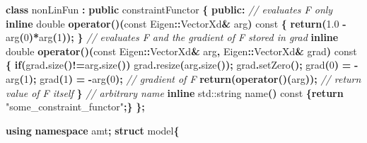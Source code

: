 \documentclass[
]{book}
\newenvironment{Shaded}{\begin{snugshade}}{\end{snugshade}}
\newcommand{\AttributeTok}[1]{\textcolor[rgb]{0.77,0.63,0.00}{#1}}
\newcommand{\BuiltInTok}[1]{#1}
\newcommand{\CommentTok}[1]{\textcolor[rgb]{0.56,0.35,0.01}{\textit{#1}}}
\newcommand{\ControlFlowTok}[1]{\textcolor[rgb]{0.13,0.29,0.53}{\textbf{#1}}}
\newcommand{\DataTypeTok}[1]{\textcolor[rgb]{0.13,0.29,0.53}{#1}}
\newcommand{\DecValTok}[1]{\textcolor[rgb]{0.00,0.00,0.81}{#1}}
\newcommand{\FloatTok}[1]{\textcolor[rgb]{0.00,0.00,0.81}{#1}}
\newcommand{\KeywordTok}[1]{\textcolor[rgb]{0.13,0.29,0.53}{\textbf{#1}}}
\newcommand{\NormalTok}[1]{#1}
\newcommand{\OperatorTok}[1]{\textcolor[rgb]{0.81,0.36,0.00}{\textbf{#1}}}
\newcommand{\StringTok}[1]{\textcolor[rgb]{0.31,0.60,0.02}{#1}}
\begin{document}
\begin{Shaded}
\begin{Highlighting}[]

\KeywordTok{class}\NormalTok{ nonLinFun }\OperatorTok{:} \KeywordTok{public}\NormalTok{ constraintFunctor }\OperatorTok{\{}
\KeywordTok{public}\OperatorTok{:}
  \CommentTok{// evaluates F only}
  \KeywordTok{inline} \DataTypeTok{double} \KeywordTok{operator}\OperatorTok{()(}\AttributeTok{const}\NormalTok{ Eigen}\OperatorTok{::}\NormalTok{VectorXd}\OperatorTok{\&}\NormalTok{ arg}\OperatorTok{)} \AttributeTok{const} \OperatorTok{\{}
    \ControlFlowTok{return}\OperatorTok{(}\FloatTok{1.0} \OperatorTok{{-}}\NormalTok{ arg}\OperatorTok{(}\DecValTok{0}\OperatorTok{)*}\NormalTok{arg}\OperatorTok{(}\DecValTok{1}\OperatorTok{));} 
  \OperatorTok{\}}
  \CommentTok{// evaluates F and the gradient of F stored in grad}
  \KeywordTok{inline} \DataTypeTok{double} \KeywordTok{operator}\OperatorTok{()(}\AttributeTok{const}\NormalTok{ Eigen}\OperatorTok{::}\NormalTok{VectorXd}\OperatorTok{\&}\NormalTok{ arg}\OperatorTok{,}
\NormalTok{                         Eigen}\OperatorTok{::}\NormalTok{VectorXd}\OperatorTok{\&}\NormalTok{ grad}\OperatorTok{)} \AttributeTok{const} \OperatorTok{\{}
    \ControlFlowTok{if}\OperatorTok{(}\NormalTok{grad}\OperatorTok{.}\NormalTok{size}\OperatorTok{()!=}\NormalTok{arg}\OperatorTok{.}\NormalTok{size}\OperatorTok{())}\NormalTok{ grad}\OperatorTok{.}\NormalTok{resize}\OperatorTok{(}\NormalTok{arg}\OperatorTok{.}\NormalTok{size}\OperatorTok{());}
\NormalTok{    grad}\OperatorTok{.}\NormalTok{setZero}\OperatorTok{();}
\NormalTok{    grad}\OperatorTok{(}\DecValTok{0}\OperatorTok{)} \OperatorTok{=} \OperatorTok{{-}}\NormalTok{arg}\OperatorTok{(}\DecValTok{1}\OperatorTok{);}
\NormalTok{    grad}\OperatorTok{(}\DecValTok{1}\OperatorTok{)} \OperatorTok{=} \OperatorTok{{-}}\NormalTok{arg}\OperatorTok{(}\DecValTok{0}\OperatorTok{);} \CommentTok{// gradient of F}
    \ControlFlowTok{return}\OperatorTok{(}\KeywordTok{operator}\OperatorTok{()(}\NormalTok{arg}\OperatorTok{));} \CommentTok{// return value of F itself}
  \OperatorTok{\}}
  \CommentTok{// arbitrary name}
  \KeywordTok{inline} \BuiltInTok{std::}\NormalTok{string}\OperatorTok{ }\NormalTok{name}\OperatorTok{()} \AttributeTok{const} \OperatorTok{\{}\ControlFlowTok{return} \StringTok{"some\_constraint\_functor"}\OperatorTok{;\}}
\OperatorTok{\};}


\KeywordTok{using} \KeywordTok{namespace}\NormalTok{ amt}\OperatorTok{;}
\KeywordTok{struct}\NormalTok{ model}\OperatorTok{\{}
  

\end{Highlighting}
\end{Shaded}
\end{document}
